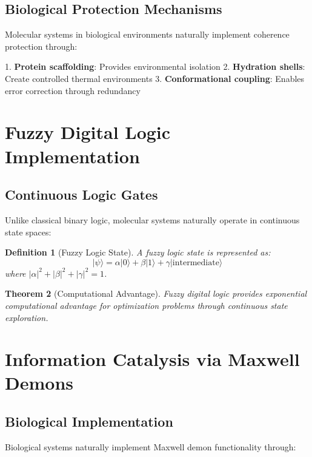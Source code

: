 \documentclass[12pt]{article}
\newtheorem{theorem}{Theorem}[section]
\newtheorem{definition}[theorem]{Definition}
\begin{document}
\subsection{Biological Protection Mechanisms}

Molecular systems in biological environments naturally implement coherence protection through:

1. \textbf{Protein scaffolding}: Provides environmental isolation
2. \textbf{Hydration shells}: Create controlled thermal environments  
3. \textbf{Conformational coupling}: Enables error correction through redundancy

\section{Fuzzy Digital Logic Implementation}

\subsection{Continuous Logic Gates}

Unlike classical binary logic, molecular systems naturally operate in continuous state spaces:

\begin{definition}[Fuzzy Logic State]
A fuzzy logic state is represented as:
\begin{equation}
|\psi\rangle = \alpha|0\rangle + \beta|1\rangle + \gamma|\text{intermediate}\rangle
\end{equation}
where $|\alpha|^2 + |\beta|^2 + |\gamma|^2 = 1$.
\end{definition}

\begin{theorem}[Computational Advantage]
Fuzzy digital logic provides exponential computational advantage for optimization problems through continuous state exploration.
\end{theorem}

\section{Information Catalysis via Maxwell Demons}

\subsection{Biological Implementation}

Biological systems naturally implement Maxwell demon functionality through:
\end{document}
